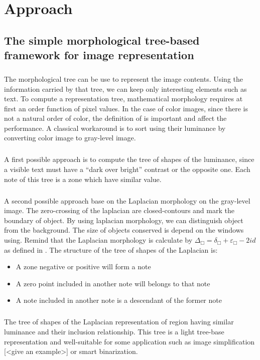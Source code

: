 
\graphicspath{ {4chapterOurApproach/image/} }
\chapter{Approach} \label{Approach}
\section{The simple morphological tree-based framework for image representation}
\paragraph{}
The morphological tree can be use to represent the image contents. Using the information carried by that tree, we can keep only interesting elements such as text. To compute a representation tree, mathematical morphology requires at first an order function of pixel values. In the case of color images, since there is not a natural order of color, the definition of is important and affect the performance. A classical workaround is to sort using their luminance by converting color image to gray-level image. 
\paragraph{}
A first possible approach is to compute the tree of shapes of the luminance, since a visible text must have a “dark over bright” contrast or the opposite one. Each note of this tree is a zone which have similar value.
\paragraph{}
A second possible approach base on the Laplacian morphology on the gray-level image. The zero-crossing of the laplacian are closed-contours and mark the boundary of object. By using laplacian morphology, we can distinguish object from the background. The size of objects conserved is depend on the windows using. Remind that the Laplacian morphology is calculate by $ \Delta_\Box = \delta_\Box + \varepsilon_\Box -2id $ as defined in \cite{Vliet_anedge}. The structure of the tree of shapes of the Laplacian is:
\begin{itemize}
\item A zone negative or positive will form a note
\item A zero point included in another note will belongs to that note
\item A note included in another note is a descendant of the former note
\end{itemize}
\paragraph{}
The tree of shapes of the Laplacian representation of region having similar luminance and their inclusion relationship. This tree is a light tree-base representation and well-suitable for some application such as image simplification [<give an example>] or smart binarization. 
